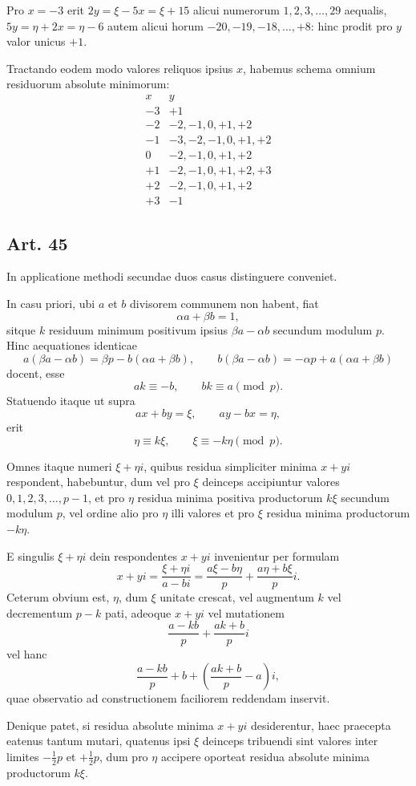 \documentclass[12pt]{article}
\newcommand{\art}[1]{\subsection*{Art. #1}}
\begin{document}
Pro $x=-3$ erit $2y=\xi-5x=\xi+15$ alicui numerorum $1,2,3,\ldots,29$ aequalis, $5y=\eta+2x=\eta-6$ autem alicui horum $-20,-19,-18,\ldots,+8$: hinc prodit pro $y$ valor unicus $+1$.

Tractando eodem modo valores reliquos ipsius $x$, habemus schema omnium residuorum absolute minimorum:
\[
\begin{array}{r|l}
x&y\\ \hline
-3&+1\\
-2&-2,-1,0,+1,+2\\
-1&-3,-2,-1,0,+1,+2\\
0&-2,-1,0,+1,+2\\
+1&-2,-1,0,+1,+2,+3\\
+2&-2,-1,0,+1,+2\\
+3&-1
\end{array}
\]

\art{45}
In applicatione methodi secundae duos casus distinguere conveniet.

In casu priori, ubi $a$ et $b$ divisorem communem non habent, fiat
\[
\alpha a+\beta b=1,
\]
sitque $k$ residuum minimum positivum ipsius $\beta a-\alpha b$ secundum modulum $p$. Hinc aequationes identicae
\[
a(\beta a-\alpha b)=\beta p-b(\alpha a+\beta b),\qquad
b(\beta a-\alpha b)=-\alpha p+a(\alpha a+\beta b)
\]
docent, esse
\[
ak\equiv -b,\qquad bk\equiv a\pmod p.
\]
Statuendo itaque ut supra
\[
ax+by=\xi,\qquad ay-bx=\eta,
\]
erit
\[
\eta\equiv k\xi,\qquad \xi\equiv -k\eta\pmod p.
\]

Omnes itaque numeri $\xi+\eta i$, quibus residua simpliciter minima $x+yi$ respondent, habebuntur, dum vel pro $\xi$ deinceps accipiuntur valores $0,1,2,3,\ldots,p-1$, et pro $\eta$ residua minima positiva productorum $k\xi$ secundum modulum $p$, vel ordine alio pro $\eta$ illi valores et pro $\xi$ residua minima productorum $-k\eta$.

E singulis $\xi+\eta i$ dein respondentes $x+yi$ invenientur per formulam
\[
x+yi=\frac{\xi+\eta i}{a-bi}
=\frac{a\xi-b\eta}{p}+\frac{a\eta+b\xi}{p}i.
\]
Ceterum obvium est, $\eta$, dum $\xi$ unitate crescat, vel augmentum $k$ vel decrementum $p-k$ pati, adeoque $x+yi$ vel mutationem
\[
\frac{a-kb}{p}+\frac{ak+b}{p}i
\]
vel hanc
\[
\frac{a-kb}{p}+b+\left(\frac{ak+b}{p}-a\right)i,
\]
quae observatio ad constructionem faciliorem reddendam inservit.

Denique patet, si residua absolute minima $x+yi$ desiderentur, haec praecepta eatenus tantum mutari, quatenus ipsi $\xi$ deinceps tribuendi sint valores inter limites $-\frac12p$ et $+\frac12p$, dum pro $\eta$ accipere oporteat residua absolute minima productorum $k\xi$.
\end{document}
